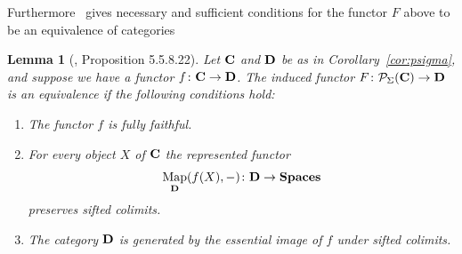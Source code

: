 \documentclass[psamsfonts]{amsart}
\theoremstyle{plain}
\newtheorem{lem}[thm]{Lemma}
\theoremstyle{definition}
\theoremstyle{remark}
\newcommand{\catname}[1]{{\normalfont\textbf{#1}}}
\newcommand{\presh}{\mathcal{P}}
\DeclareMathOperator{\map}{Map}
\begin{document}
Furthermore~\cite[Proposition 5.5.8.22]{LurieHTT} gives necessary and sufficient conditions for the functor $F$ above to be  an equivalence of categories
\begin{lem}[\cite{LurieHTT}, Proposition 5.5.8.22]\label{lemma:equivalence conditions}
Let $\catname{C}$ and $\catname{D}$ be as in Corollary~\ref{cor:psigma}, and suppose we have a functor $f\colon\catname{C}\to \catname{D}$. The induced functor $F\colon \presh_{\Sigma}(\catname{C})\to \catname{D}$ is an equivalence if the following conditions hold:
\begin{enumerate}
\item The functor $f$ is fully faithful. \label{faithful}
\item For every object $X$ of $\catname{C}$ the represented functor  \label{sifted}
\[
\map_{\catname{D}}(f(X) , -)\colon \catname{D}\to \catname{Spaces}
\] 
preserves sifted colimits.
\item The category $\catname{D}$ is generated by the essential image of $f$ under sifted colimits. \label{generates}
\end{enumerate}
\end{lem}
\end{document}
